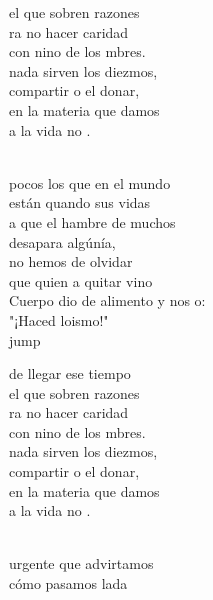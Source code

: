 \begin{cancion}
\begin{chorus}
	el que sobren razones\\
	ra no hacer caridad \\
	con nino de los mbres.\\
	nada sirven los diezmos,\\
	compartir o el donar,\\
	 en la materia que damos\\
	a la vida no .   \\
	\end{chorus}%
	\jump\\
	 pocos los que en el mundo \\
	están quando sus vidas\\
	a que el hambre de muchos \\
	desapara algúnía,\\
	 no hemos de olvidar \\
	que quien a quitar vino\\
	Cuerpo dio de alimento y nos o:\\
	"¡Haced loismo!"\\jump\\
	\begin{chorus}%
	de llegar ese tiempo \\
	el que sobren razones\\
	ra no hacer caridad \\
	con nino de los mbres.\\
	nada sirven los diezmos,\\
	compartir o el donar,\\
	 en la materia que damos\\
	a la vida no .   \\
	\end{chorus}%
	\jump\\
	urgente que advirtamos \\
	cómo pasamos lada\\
	\jump\\

\end{cancion}

